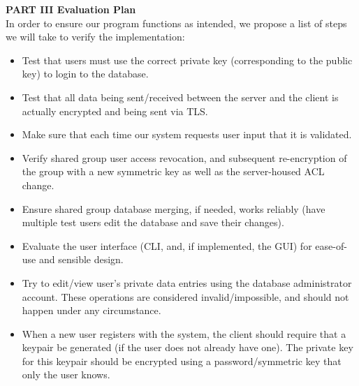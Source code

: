 \documentclass[11pt, letterpaper]{article}
\newcommand{\DesignSection}[1]
{\noindent\textbf{#1}\\}
\begin{document}
\DesignSection{PART III Evaluation Plan}
\noindent
In order to ensure our program functions as intended, we propose a list of steps we will take to verify the implementation:
\begin{itemize} \itemsep1pt \parskip0pt 
\item Test that users must use the correct private key (corresponding to the public key) to login to the database.
\item Test that all data being sent/received between the server and the client is actually encrypted and being sent via TLS.
\item Make sure that each time our system requests user input that it is validated.
\item Verify shared group user access revocation, and subsequent re-encryption of the group with a new symmetric key as well as the server-housed ACL change.
\item Ensure shared group database merging, if needed, works reliably (have multiple test users edit the database and save their changes).
\item Evaluate the user interface (CLI, and, if implemented, the GUI) for ease-of-use and sensible design.
\item Try to edit/view user’s private data  entries using the database administrator account. These operations are considered invalid/impossible, and should not happen under any circumstance.
\item When a new user registers with the system, the client should require that a keypair be generated (if the user does not already have one). The private key for this keypair should be encrypted using a password/symmetric key that only the user knows.
\end{itemize}
\end{document}
